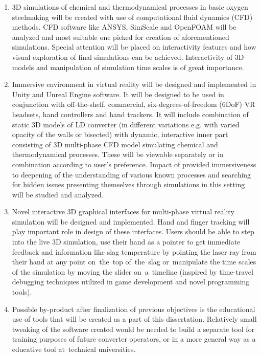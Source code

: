 \begin{enumerate}
{}
\item{3D simulations of chemical and thermodynamical processes in basic oxygen steelmaking will be created with use of computational fluid dynamics (CFD) methods. CFD software like ANSYS, SimScale and OpenFOAM will be analyzed and most suitable one picked for creation of aforementioned simulations. Special attention will be placed on interactivity features and how visual exploration of final simulations can be achieved. Interactivity of 3D models and manipulation of simulation time scales is of great importance.}
\item{Immersive environment in virtual reality will be designed and implemented in Unity and Unreal Engine software. It will be designed to be used in conjunction with off-the-shelf, commercial, six-degrees-of-freedom (6DoF) VR headsets, hand controllers and hand trackers. It will include combination of static 3D models of LD converter (in different variations e.g. with varied opacity of the walls or bisected) with dynamic, interactive inner part consisting of 3D multi-phase CFD model simulating chemical and thermodynamical processes. These will be viewable separately or in combination according to user's preference. Impact of provided immersiveness to deepening of the understanding of various known processes and searching for hidden issues presenting themselves through simulations in this setting will be studied and analyzed.}
\item{Novel interactive 3D graphical interfaces for multi-phase virtual reality simulation will be designed and implemented. Hand and finger tracking will play important role in design of these interfaces. Users should be able to step into the live 3D simulation, use their hand as a pointer to get immediate feedback and information like slag temperature by pointing the laser ray from their hand at any point on~the~top of~the~slag or~manipulate the time scales of the simulation by moving the slider on~a~timeline (inspired by time-travel debugging techniques utilized in game development and novel programming tools).}
\item{Possible by-product after finalization of previous objectives is the educational use of tools that will be created as a part of this dissertation. Relatively small tweaking of the software created would be needed to build a separate tool for training purposes of future converter operators, or in a more general way as a educative tool at~technical universities.}
\end{enumerate}

